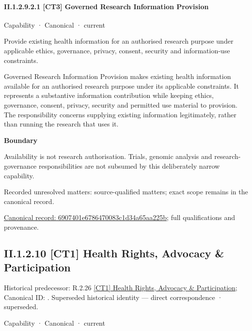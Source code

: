 \paragraph*{II.1.2.9.2.1 [CT3] Governed Research Information Provision}
\label{navigation:II.1.2.9.2.1}

\label{element:6907401e6786470083c1d34a65aa225b}
{\small Capability · Canonical · current}\par

Provide existing health information for an authorised research purpose under applicable ethics, governance, privacy, consent, security and information-use constraints.



Governed Research Information Provision makes existing health information available for an authorised research purpose under its applicable constraints. It represents a substantive information contribution while keeping ethics, governance, consent, privacy, security and permitted use material to provision. The responsibility concerns supplying existing information legitimately, rather than running the research that uses it.



\textbf{Boundary}



Availability is not research authorisation. Trials, genomic analysis and research-governance responsibilities are not subsumed by this deliberately narrow capability.


{\small Recorded unresolved matters: source-qualified matters; exact scope remains in the canonical record.}\par
{\footnotesize \href{../../../../../../../continuum/strategy/capability/6907401e6786470083c1d34a65aa225b.md}{Canonical record: 6907401e6786470083c1d34a65aa225b}; full qualifications and provenance.}\par
\subsection*{II.1.2.10 [CT1] Health Rights, Advocacy \& Participation}
\label{navigation:II.1.2.10}

{\small Historical predecessor: R.2.26 \hyperref[element:58376e5c53bf4af0a54f99f21ac52666]{[CT1] Health Rights, Advocacy \& Participation}; Canonical ID: \texttt{}. Superseded historical identity — direct correspondence · superseded.}\par
\label{element:7ab5c82a500b45f39267883a6e78c482}
{\small Capability · Canonical · current}\par

